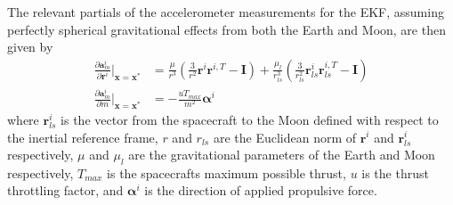 \documentclass[letterpaper, paper,11pt]{AAS}		%
\begin{document}
The relevant partials of the accelerometer measurements for the EKF, assuming perfectly spherical gravitational effects from both the Earth and Moon, are then given by
\begin{align}
	\frac{\partial \mathbf{a}_{m}^i}{\partial \mathbf{r}^i}\bigg|_{\mathbf{x}=\mathbf{x}^*} &= \frac{\mu}{r^3}\left(\frac{3}{r^2}\mathbf{r}^i\mathbf{r}^{i,T} - \mathbf{I}\right) + \frac{\mu_l}{r_{ls}^3}\left(\frac{3}{r_{ls}^2}\mathbf{r}_{ls}^i\mathbf{r}_{ls}^{i,T} - \mathbf{I}\right) \label{eqn:apartr}\\
	\frac{\partial \mathbf{a}_{m}^i}{\partial m}\bigg|_{\mathbf{x}=\mathbf{x}^*} &= -\frac{u T_{max}}{m^2}\boldsymbol{\alpha}^i
	\label{eqn:apartm}
\end{align}
where $\mathbf{r}_{ls}^i$ is the vector from the spacecraft to the Moon defined with respect to the inertial reference frame, $r$ and $r_{ls}$ are the Euclidean norm of $\mathbf{r}^i$ and $\mathbf{r}_{ls}^i$ respectively, $\mu$ and $\mu_l$ are the gravitational parameters of the Earth and Moon respectively, $T_{max}$ is the spacecrafts maximum possible thrust, $u$ is the thrust throttling factor, and $\boldsymbol{\alpha}^i$ is the direction of applied propulsive force.
\end{document}
